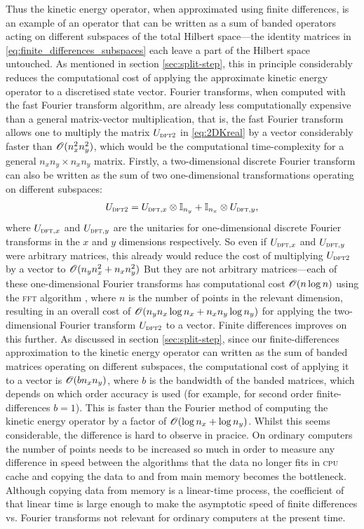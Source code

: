 Thus the kinetic energy operator, when approximated using finite differences, is an example of an operator that can be written as a sum of banded operators acting on different subspaces of the total Hilbert space---the identity matrices in \eqref{eq:finite_differences_subspaces} each leave a part of the Hilbert space untouched. As mentioned in section \ref{sec:split-step}, this in principle considerably reduces the computational cost of applying the approximate kinetic energy operator to a discretised state vector. Fourier transforms, when computed with the fast Fourier transform algorithm, are already less computationally expensive than a general matrix-vector multiplication, that is, the fast Fourier transform allows one to multiply the matrix $U_{\textsc{dft2}}$ in \eqref{eq:2DKreal} by a vector considerably faster than $\mathscr{O}(n_x^2n_y^2)$, which would be the computational time-complexity for a general $n_xn_y \times n_xn_y$ matrix. Firstly, a two-dimensional discrete Fourier transform can also be written as the sum of two one-dimensional transformations operating on different subspaces:
\begin{align}
U_{\textsc{dft2}} =
U_{\textsc{dft},x} \otimes \mathbb{I}_{n_y} + \mathbb{I}_{n_x} \otimes U_{\textsc{dft},y},
\end{align}
where $U_{\textsc{dft},x}$ and $U_{\textsc{dft},y}$ are the unitaries for one-dimensional discrete Fourier transforms in the $x$ and $y$ dimensions respectively. So even if $U_{\textsc{dft},x}$ and $U_{\textsc{dft},y}$ were arbitrary matrices, this already would reduce the cost of multiplying $U_{\textsc{dft2}}$ by a vector to $\mathscr{O}(n_y n_x^2 + n_x n_y^2)$ But they are not arbitrary matrices---each of these one-dimensional Fourier transforms has computational cost $\mathscr{O}(n \log n)$ using the \textsc{fft} algorithm \cite[p.~600]{press2007numerical}, where $n$ is the number of points in the relevant dimension, resulting in an overall cost of $\mathscr{O}(n_y n_x \log n_x + n_x n_y\log n_y)$ for applying the two-dimensional Fourier transform $U_{\textsc{dft2}}$ to a vector. Finite differences improves on this further. As discussed in section \ref{sec:split-step}, since our finite-differences approximation to the kinetic energy operator can written as the sum of banded matrices operating on different subspaces, the computational cost of applying it to a vector is $\mathscr{O}(bn_xn_y)$, where $b$ is the bandwidth of the banded matrices, which depends on which order accuracy is used (for example, for second order finite-differences $b=1$). This is faster than the Fourier method of computing the kinetic energy operator by a factor of $\mathscr{O}(\log n_x + \log n_y)$. Whilst this seems considerable, the difference is hard to observe in pracice. On ordinary computers the number of points needs to be increased so much in order to measure any difference in speed between the algorithms that the data no longer fits in \textsc{cpu} cache and copying the data to and from main memory becomes the bottleneck. Although copying data from memory is a linear-time process, the coefficient of that linear time is large enough to make the asymptotic speed of finite differences vs. Fourier transforms not relevant for ordinary computers at the present time.

